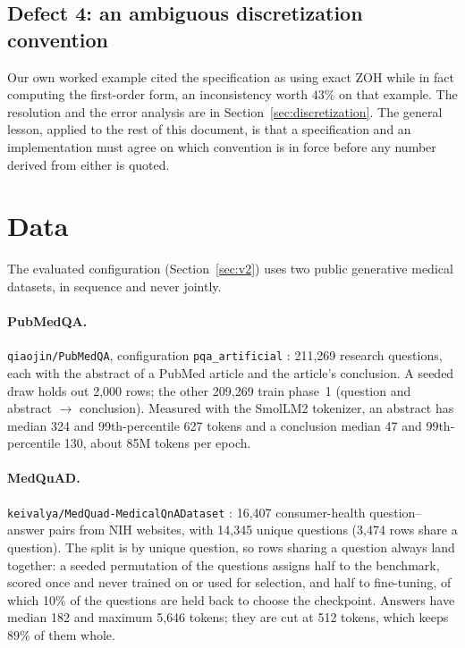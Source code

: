 \documentclass[11pt,a4paper]{article}
\theoremstyle{plain}
\theoremstyle{definition}
\theoremstyle{remark}
\begin{document}
\subsection{Defect 4: an ambiguous discretization convention}

\noindent
Our own worked example cited the specification as using exact ZOH while in
fact computing the first-order form, an inconsistency worth $43\%$ on that
example. The resolution and the error analysis are in
Section~\ref{sec:discretization}. The general lesson, applied to the rest of
this document, is that a specification and an implementation must agree on
which convention is in force before any number derived from either is quoted.

\section{Data}

\noindent
The evaluated configuration (Section~\ref{sec:v2}) uses two public generative
medical datasets, in sequence and never jointly.

\paragraph{PubMedQA.}
\texttt{qiaojin/PubMedQA}, configuration \texttt{pqa\_artificial}
\cite{jin2019pubmedqa}: 211{,}269 research questions, each with the abstract
of a PubMed article and the article's conclusion. A seeded draw holds out
2{,}000 rows; the other 209{,}269 train phase~1 (question and abstract
$\to$ conclusion). Measured with the SmolLM2 tokenizer, an abstract has median
324 and 99th-percentile 627 tokens and a conclusion median 47 and
99th-percentile 130, about 85M tokens per epoch.

\paragraph{MedQuAD.}
\texttt{keivalya/MedQuad-MedicalQnADataset} \cite{benabacha2019medquad}:
16{,}407 consumer-health question--answer pairs from NIH websites, with
14{,}345 unique questions (3{,}474 rows share a question). The split is by
unique question, so rows sharing a question always land together: a seeded
permutation of the questions assigns half to the benchmark, scored once and
never trained on or used for selection, and half to fine-tuning, of which
10\% of the questions are held back to choose the checkpoint. Answers have
median 182 and maximum 5{,}646 tokens; they are cut at 512 tokens, which keeps
89\% of them whole.
\end{document}
